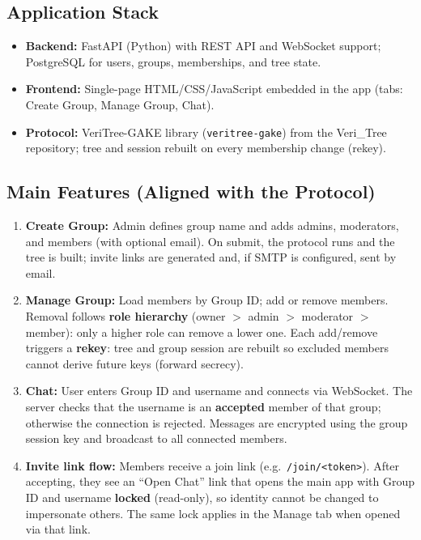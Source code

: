 \documentclass[12pt,a4paper]{report}
\begin{document}
\subsection{Application Stack}

\begin{itemize}
\item \textbf{Backend:} FastAPI (Python) with REST API and WebSocket support; PostgreSQL for users, groups, memberships, and tree state.
\item \textbf{Frontend:} Single-page HTML/CSS/JavaScript embedded in the app (tabs: Create Group, Manage Group, Chat).
\item \textbf{Protocol:} VeriTree-GAKE library (\texttt{veritree-gake}) from the Veri\_Tree repository; tree and session rebuilt on every membership change (rekey).
\end{itemize}

\subsection{Main Features (Aligned with the Protocol)}

\begin{enumerate}
\item \textbf{Create Group:} Admin defines group name and adds admins, moderators, and members (with optional email). On submit, the protocol runs and the tree is built; invite links are generated and, if SMTP is configured, sent by email.
\item \textbf{Manage Group:} Load members by Group ID; add or remove members. Removal follows \textbf{role hierarchy} (owner $>$ admin $>$ moderator $>$ member): only a higher role can remove a lower one. Each add/remove triggers a \textbf{rekey}: tree and group session are rebuilt so excluded members cannot derive future keys (forward secrecy).
\item \textbf{Chat:} User enters Group ID and username and connects via WebSocket. The server checks that the username is an \textbf{accepted} member of that group; otherwise the connection is rejected. Messages are encrypted using the group session key and broadcast to all connected members.
\item \textbf{Invite link flow:} Members receive a join link (e.g.\ \texttt{/join/<token>}). After accepting, they see an ``Open Chat'' link that opens the main app with Group ID and username \textbf{locked} (read-only), so identity cannot be changed to impersonate others. The same lock applies in the Manage tab when opened via that link.
\end{enumerate}
\end{document}
